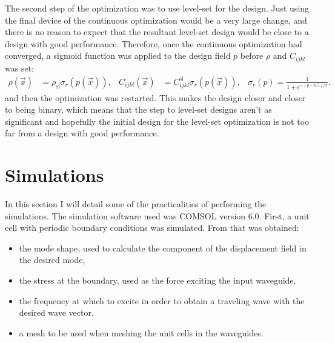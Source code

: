 The second step of the optimization was to use level-set for the design.
Just using the final device of the continuous optimization would be a very large
change, and there is no reason to expect that the resultant level-set design
would be close to a design with good performance.
Therefore, once the continuous optimization had converged, a sigmoid function
was applied to the design field $p$ before $\rho$ and $C_{ijkl}$ was set:
\begin{align}
	\rho(\vec x) &= \rho_\text{si} \sigma_r(p(\vec x)),
	&
	C_{ijkl}(\vec x) &= C_{ijkl}^\text{si} \sigma_r(p(\vec x)),
	&
	\sigma_r(p) = \frac{1}{1+e^{-(p-0.5)/r}}.
\end{align}
and then the optimization was restarted.
This makes the design closer and closer to being binary, which means that the
step to level-set designs aren't as significant and hopefully the initial design
for the level-set optimization is not too far from a design with good performance.

\section{Simulations}

In this section I will detail some of the practicalities of performing the
simulations.
The simulation software used was COMSOL version 6.0.
First, a unit cell with periodic boundary conditions was simulated.
From that was obtained:
\begin{itemize}
	\item the mode shape, used to calculate the component of the displacement
		field in the desired mode,
	\item the stress at the boundary, used as the force exciting the input
		waveguide,
	\item the frequency at which to excite in order to obtain a traveling wave
		with the desired wave vector.
	\item a mesh to be used when meshing the unit cells in the waveguides.
\end{itemize}

